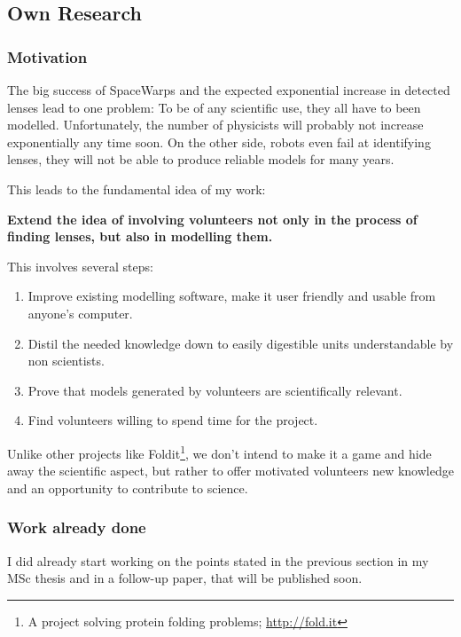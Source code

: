 \documentclass[11pt]{article}
\begin{document}
\subsection{Own Research}

\subsubsection{Motivation}

The big success of SpaceWarps and the expected exponential increase in detected lenses lead to one problem:
To be of any scientific use, they all have to been modelled.
Unfortunately, the number of physicists will probably not increase exponentially any time soon.
On the other side, robots even fail at identifying lenses, they will not be able to produce reliable models for many years.

This leads to the fundamental idea of my work:

{\bf Extend the idea of involving volunteers not only in the process of finding lenses, but also in modelling them.}

This involves several steps:

\begin{enumerate}
  \item Improve existing modelling software, make it user friendly and usable from anyone’s computer.
  \item Distil the needed knowledge down to easily digestible units understandable by non scientists.
  \item Prove that models generated by volunteers are scientifically relevant.
  \item Find volunteers willing to spend time for the project.
\end{enumerate}

Unlike other projects like Foldit\footnote{A project solving protein folding problems; \url{http://fold.it}}, we don't intend to make it a game and hide away the scientific aspect, but rather to offer motivated volunteers new knowledge and an opportunity to contribute to science.


\subsubsection{Work already done}

I did already start working on the points stated in the previous section in my MSc thesis and in a follow-up paper, that will be published soon.
\end{document}
